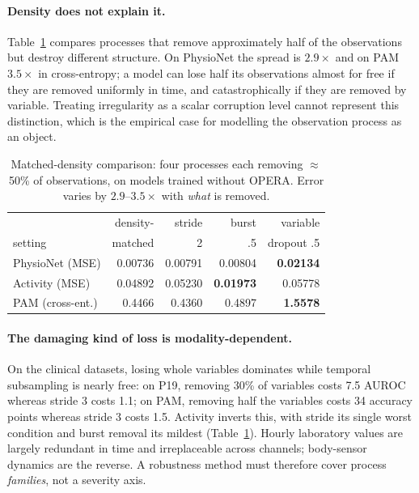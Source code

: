 \paragraph{Density does not explain it.}
Table~\ref{tab:density} compares processes that remove approximately half of the observations but destroy
different structure. On PhysioNet the spread is $2.9\times$ and on PAM $3.5\times$ in cross-entropy; a model can
lose half its observations almost for free if they are removed uniformly in time, and catastrophically if they
are removed by variable. Treating irregularity as a scalar corruption level cannot represent this distinction,
which is the empirical case for modelling the observation process as an object.

\begin{table}[t]
\caption{Matched-density comparison\prelim: four processes each removing $\approx$50\% of observations, on
models trained without OPERA. Error varies by $2.9$--$3.5\times$ with \emph{what} is removed.}
\label{tab:density}
\small
\begin{tabular}{lrrrr}
\toprule
 & density- & stride & burst & variable \\
setting & matched & 2 & .5 & dropout .5 \\
\midrule
PhysioNet (MSE) & 0.00736 & 0.00791 & 0.00804 & \textbf{0.02134} \\
Activity (MSE) & 0.04892 & 0.05230 & \textbf{0.01973} & 0.05778 \\
PAM (cross-ent.) & 0.4466 & 0.4360 & 0.4897 & \textbf{1.5578} \\
\bottomrule
\end{tabular}
\end{table}

\paragraph{The damaging kind of loss is modality-dependent.}
On the clinical datasets, losing whole variables dominates while temporal subsampling is nearly free: on P19,
removing 30\% of variables costs 7.5 AUROC whereas stride 3 costs 1.1; on PAM, removing half the variables costs
34 accuracy points whereas stride 3 costs 1.5. Activity inverts this, with stride its single worst condition and
burst removal its mildest (Table~\ref{tab:density}). Hourly laboratory values are largely redundant in time and
irreplaceable across channels; body-sensor dynamics are the reverse. A robustness method must therefore cover
process \emph{families}, not a severity axis.
